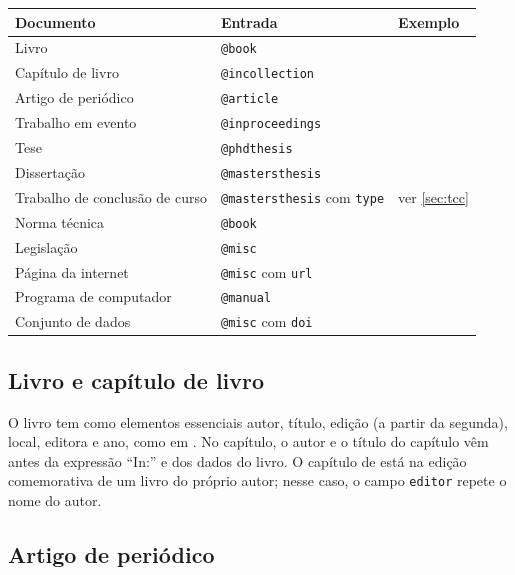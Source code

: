 \documentclass[
	12pt, %
	openright, %
	oneside, %
	a4paper, %
	sumario=tradicional, %
	english, %
	brazil, %
]{abntex2}
\begin{document}
\begin{quadro}[htbp]
	\caption{Tipos de documento e entradas no arquivo .bib}\label{qua:tipos-bib}
	\centering
	\small
	\begin{tabular}{p{}p{}p{}}
		\toprule
		\textbf{Documento} & \textbf{Entrada} & \textbf{Exemplo} \\
		\midrule
		Livro & \texttt{@book} & \cite{lamport1994} \\
		Capítulo de livro & \texttt{@incollection} & \cite{brooks1995} \\
		Artigo de periódico & \texttt{@article} & \cite{wilson2017} \\
		Trabalho em evento & \texttt{@inproceedings} & \cite{dean2004} \\
		Tese & \texttt{@phdthesis} & \cite{fielding2000} \\
		Dissertação & \texttt{@mastersthesis} & \cite{shannon1940} \\
		Trabalho de conclusão de curso & \texttt{@mastersthesis} com \texttt{type} & ver \autoref{sec:tcc} \\
		Norma técnica & \texttt{@book} & \cite{abnt14724} \\
		Legislação & \texttt{@misc} & \cite{brasil1998} \\
		Página da internet & \texttt{@misc} com \texttt{url} & \cite{semver} \\
		Programa de computador & \texttt{@manual} & \cite{biblatexabnt} \\
		Conjunto de dados & \texttt{@misc} com \texttt{doi} & \cite{fisher1936} \\
		\bottomrule
	\end{tabular}
\end{quadro}

\subsection{Livro e capítulo de livro}

O livro tem como elementos essenciais autor, título, edição (a partir da segunda), local, editora e ano, como em . No capítulo, o autor e o título do capítulo vêm antes da expressão ``In:'' e dos dados do livro. O capítulo de  está na edição comemorativa de um livro do próprio autor; nesse caso, o campo \texttt{editor} repete o nome do autor.

\subsection{Artigo de periódico}
\end{document}
